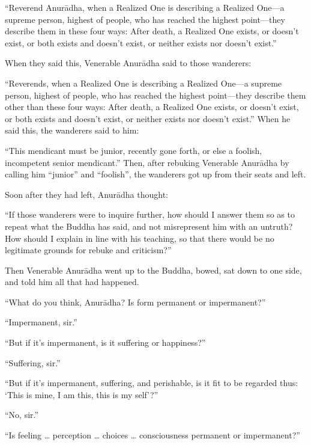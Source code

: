 \documentclass[12pt,openany]{book}%
\begin{document}
“Reverend \textsanskrit{Anurādha}, when a Realized One is describing a Realized One—a supreme person, highest of people, who has reached the highest point—they describe them in these four ways: After death, a Realized One exists, or doesn’t exist, or both exists and doesn’t exist, or neither exists nor doesn’t exist.” 

When they said this, Venerable \textsanskrit{Anurādha} said to those wanderers: 

“Reverends, when a Realized One is describing a Realized One—a supreme person, highest of people, who has reached the highest point—they describe them other than these four ways: After death, a Realized One exists, or doesn’t exist, or both exists and doesn’t exist, or neither exists nor doesn’t exist.” When he said this, the wanderers said to him: 

“This mendicant must be junior, recently gone forth, or else a foolish, incompetent senior mendicant.” Then, after rebuking Venerable \textsanskrit{Anurādha} by calling him “junior” and “foolish”, the wanderers got up from their seats and left. 

Soon after they had left, \textsanskrit{Anurādha} thought: 

“If those wanderers were to inquire further, how should I answer them so as to repeat what the Buddha has said, and not misrepresent him with an untruth? How should I explain in line with his teaching, so that there would be no legitimate grounds for rebuke and criticism?” 

Then Venerable \textsanskrit{Anurādha} went up to the Buddha, bowed, sat down to one side, and told him all that had happened. 

“What do you think, \textsanskrit{Anurādha}? Is form permanent or impermanent?” 

“Impermanent, sir.” 

“But if it’s impermanent, is it suffering or happiness?” 

“Suffering, sir.” 

“But if it’s impermanent, suffering, and perishable, is it fit to be regarded thus: ‘This is mine, I am this, this is my self’?” 

“No, sir.” 

“Is feeling … perception … choices … consciousness permanent or impermanent?” 
\end{document}
